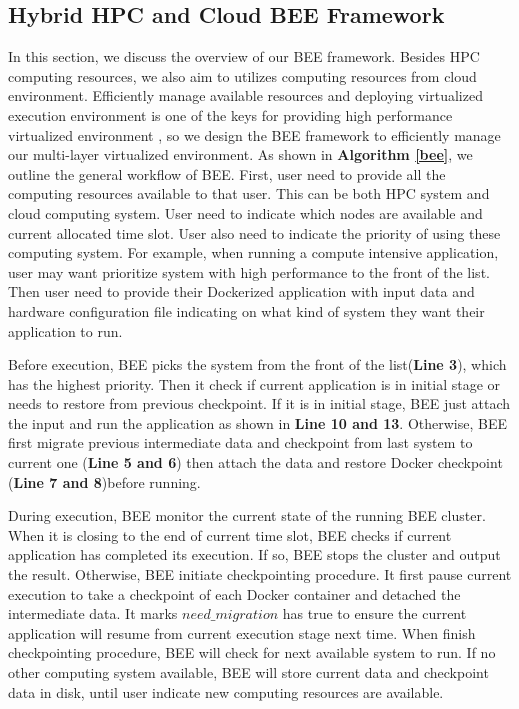 \subsection{Hybrid HPC and Cloud BEE Framework}

In this section, we discuss the overview of our BEE framework. Besides HPC computing resources, we also aim to utilizes computing resources from cloud environment. Efficiently manage available resources and deploying virtualized execution environment is one of the keys for providing high performance virtualized environment \cite{huang2006case, mateescu2011hybrid}, so we design the BEE framework to efficiently manage our multi-layer virtualized environment.  As shown in \textbf{Algorithm \ref{bee}}, we outline the general workflow of BEE. First, user need to provide all the computing resources available to that user. This can be both HPC system and cloud computing system. User need to indicate which nodes are available and current allocated time slot. User also need to indicate the priority of using these computing system. For example, when running a compute intensive application, user may want prioritize system with high performance to the front of the list. Then user need to provide their Dockerized application with input data and hardware configuration file indicating on what kind of system they want their application to run. 

Before execution, BEE picks the system from the front of the list(\textbf{Line 3}), which has the highest priority. Then it check if current application is in initial stage or needs to restore from previous checkpoint. If it is in initial stage, BEE just attach the input and run the application as shown in \textbf{Line 10 and 13}. Otherwise, BEE first migrate previous intermediate data and checkpoint from last system to current one (\textbf{Line 5 and 6}) then attach the data and restore Docker checkpoint (\textbf{Line 7 and 8})before running. 

During execution, BEE monitor the current state of the running BEE cluster. When it is closing to the end of current time slot, BEE checks if current application has completed its execution. If so, BEE stops the cluster and output the result. Otherwise, BEE initiate checkpointing procedure. It first pause current execution to take a checkpoint of each Docker container and detached the intermediate data. It marks $need\_migration$ has true to ensure the current application will resume from current execution stage next time. When finish checkpointing procedure, BEE will check for next available system to run. If no other computing system available, BEE will store current data and checkpoint data in disk, until user indicate new computing resources are available.
	

